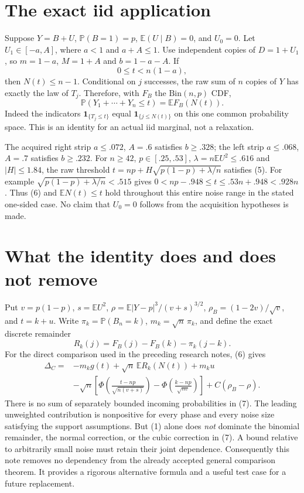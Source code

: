 \documentclass[11pt]{article}
\newcommand{\E}{\mathbb E}\newcommand{\Pp}{\mathbb P}
\begin{document}
\section*{The exact iid application}
Suppose $Y=B+U$, $\Pp(B=1)=p$, $\E(U\mid B)=0$, and $U_0=0$.
Let $U_1\in[-a,A]$, where $a<1$ and $a+A\le1$.
Use independent copies of $D=1+U_1$, so $m=1-a$, $M=1+A$ and
$b=1-a-A$. If
\[
                         0\le t<n(1-a),                    \tag{5}
\]
then $N(t)\le n-1$. Conditional on $j$ successes, the raw sum of $n$
copies of $Y$ has exactly the law of $T_j$. Therefore, with $F_B$ the
$\mathrm{Bin}(n,p)$ CDF,
\[
             \Pp(Y_1+\cdots+Y_n\le t)=\E F_B(N(t)).        \tag{6}
\]
Indeed the indicators $\mathbf1_{\{T_j\le t\}}$ equal
$\mathbf1_{\{j\le N(t)\}}$ on this one common probability space.
This is an identity for an actual iid marginal, not a relaxation.

The acquired right strip $a\le.072$, $A=.6$ satisfies $b\ge.328$;
the left strip $a\le.068$, $A=.7$ satisfies $b\ge.232$.
For $n\ge42$, $p\in[.25,.53]$, $\lambda=n\E U^2\le.616$ and
$|H|\le1.84$, the raw threshold
$t=np+H\sqrt{p(1-p)+\lambda/n}$ satisfies (5). For example
$\sqrt{p(1-p)+\lambda/n}<.515$ gives
$0<np-.948\le t\le.53n+.948<.928n$.
Thus (6) and $\E N(t)\le t$ hold throughout this entire noise range
in the stated one-sided case. No claim that $U_0=0$ follows from the
acquisition hypotheses is made.

\section*{What the identity does and does not remove}
Put $v=p(1-p)$, $s=\E U^2$, $\rho=\E|Y-p|^3/(v+s)^{3/2}$,
$\rho_B=(1-2v)/\sqrt v$, and $t=k+u$. Write $\pi_k=\Pp(B_n=k)$,
$m_k=\sqrt n\,\pi_k$, and define the exact discrete remainder
\[
 R_k(j)=F_B(j)-F_B(k)-\pi_k(j-k).
\]
For the direct comparison used in the preceding research notes, (6) gives
\begin{align*}
 \Delta_C={}&-m_k g(t)+\sqrt n\,\E R_k(N(t))+m_k u\\
 &-\sqrt n\left[
 \Phi\!\left(\frac{t-np}{\sqrt{n(v+s)}}\right)
 -\Phi\!\left(\frac{k-np}{\sqrt{nv}}\right)\right]
 +C(\rho_B-\rho).                                           \tag{7}
\end{align*}
There is no sum of separately bounded incoming probabilities in (7).
The leading unweighted contribution is nonpositive for every phase and
every noise size satisfying the support assumptions. But (1) alone does
\emph{not} dominate the binomial remainder, the normal correction, or the
cubic correction in (7). A bound relative to arbitrarily small noise must
retain their joint dependence. Consequently this note removes no dependency
from the already accepted general comparison theorem. It provides a
rigorous alternative formula and a useful test case for a future replacement.
\end{document}
